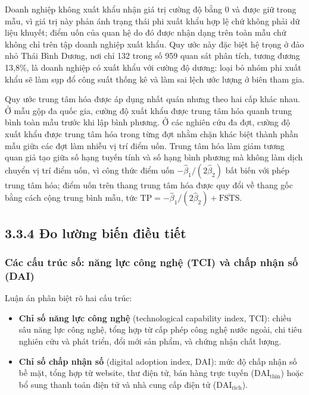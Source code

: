 \documentclass[
  a4paper,
  13pt]{extreport}
\providecommand{\tightlist}{%
  \setlength{\itemsep}{0pt}\setlength{\parskip}{0pt}}
\begin{document}
Doanh nghiệp không xuất khẩu nhận giá trị cường độ bằng 0 và được giữ
trong mẫu, vì giá trị này phản ánh trạng thái phi xuất khẩu hợp lệ chứ
không phải dữ liệu khuyết; điểm uốn của quan hệ do đó được nhận dạng
trên toàn mẫu chứ không chỉ trên tập doanh nghiệp xuất khẩu. Quy ước này
đặc biệt hệ trọng ở đảo nhỏ Thái Bình Dương, nơi chỉ 132 trong số 959
quan sát phân tích, tương đương 13,8\%, là doanh nghiệp có xuất khẩu với
cường độ dương: loại bỏ nhóm phi xuất khẩu sẽ làm sụp đổ công suất thống
kê và làm sai lệch ước lượng ở biên tham gia.

Quy ước trung tâm hóa được áp dụng nhất quán nhưng theo hai cấp khác
nhau. Ở mẫu gộp đa quốc gia, cường độ xuất khẩu được trung tâm hóa quanh
trung bình toàn mẫu trước khi lập bình phương. Ở các nghiên cứu đa đợt,
cường độ xuất khẩu được trung tâm hóa trong từng đợt nhằm chặn khác biệt
thành phần mẫu giữa các đợt làm nhiễu vị trí điểm uốn. Trung tâm hóa làm
giảm tương quan giả tạo giữa số hạng tuyến tính và số hạng bình phương
mà không làm dịch chuyển vị trí điểm uốn, vì công thức điểm uốn
\(-\hat\beta_1/(2\hat\beta_2)\) bất biến với phép trung tâm hóa; điểm
uốn trên thang trung tâm hóa được quy đổi về thang gốc bằng cách cộng
trung bình mẫu, tức
\(\mathrm{TP} = -\hat\beta_1/(2\hat\beta_2) + \overline{\mathrm{FSTS}}\).

\hypertarget{ux111o-lux1b0ux1eddng-biux1ebfn-ux111iux1ec1u-tiux1ebft}{%
\subsection{3.3.4 Đo lường biến điều
tiết}\label{ux111o-lux1b0ux1eddng-biux1ebfn-ux111iux1ec1u-tiux1ebft}}

\hypertarget{cuxe1c-cux1ea5u-truxfac-sux1ed1-nux103ng-lux1ef1c-cuxf4ng-nghux1ec7-tci-vuxe0-chux1ea5p-nhux1eadn-sux1ed1-dai}{%
\subsubsection{Các cấu trúc số: năng lực công nghệ (TCI) và chấp nhận số
(DAI)}\label{cuxe1c-cux1ea5u-truxfac-sux1ed1-nux103ng-lux1ef1c-cuxf4ng-nghux1ec7-tci-vuxe0-chux1ea5p-nhux1eadn-sux1ed1-dai}}

Luận án phân biệt rõ hai cấu trúc:

\begin{itemize}
\tightlist
\item
  \textbf{Chỉ số năng lực công nghệ} (technological capability index,
  \(\mathrm{TCI}\)): chiều sâu năng lực công nghệ, tổng hợp từ cấp phép
  công nghệ nước ngoài, chi tiêu nghiên cứu và phát triển, đổi mới sản
  phẩm, và chứng nhận chất lượng.
\item
  \textbf{Chỉ số chấp nhận số} (digital adoption index,
  \(\mathrm{DAI}\)): mức độ chấp nhận số bề mặt, tổng hợp từ website,
  thư điện tử, bán hàng trực tuyến (\(\mathrm{DAI}_{\text{thin}}\)) hoặc
  bổ sung thanh toán điện tử và nhà cung cấp điện tử
  (\(\mathrm{DAI}_{\text{rich}}\)).
\end{itemize}
\end{document}

